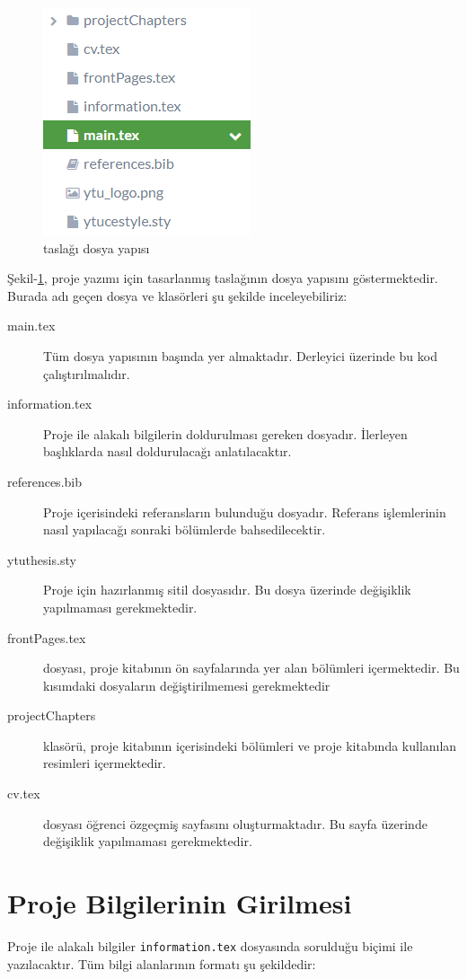 \begin{figure}[!ht]
  \centering
  \includegraphics{zkilavuz/dosyayapisi}
  \caption{\latex taslağı dosya yapısı}
  \label{fig:dosyayapisi}
\end{figure}

Şekil-\ref{fig:dosyayapisi}, proje yazımı için tasarlanmış \latex taslağının dosya yapısını göstermektedir. Burada adı geçen dosya ve klasörleri şu şekilde inceleyebiliriz:

\begin{description}
    \item[main.tex] Tüm dosya yapısının başında yer almaktadır. Derleyici üzerinde bu kod çalıştırılmalıdır.
    \item[information.tex] Proje ile alakalı bilgilerin doldurulması gereken dosyadır. İlerleyen başlıklarda nasıl doldurulacağı anlatılacaktır.
    \item[references.bib] Proje içerisindeki referansların bulunduğu dosyadır. Referans işlemlerinin nasıl yapılacağı sonraki bölümlerde bahsedilecektir.
    \item[ytuthesis.sty] Proje için hazırlanmış sitil dosyasıdır. Bu dosya üzerinde değişiklik yapılmaması gerekmektedir.
    \item[frontPages.tex] dosyası, proje kitabının ön sayfalarında yer alan bölümleri içermektedir. Bu kısımdaki dosyaların değiştirilmemesi gerekmektedir \item[projectChapters] klasörü, proje kitabının içerisindeki bölümleri ve proje kitabında kullanılan resimleri içermektedir.
    \item[cv.tex] dosyası öğrenci özgeçmiş sayfasını oluşturmaktadır. Bu sayfa üzerinde değişiklik yapılmaması gerekmektedir.
\end{description}

\section{Proje Bilgilerinin Girilmesi}
Proje ile alakalı bilgiler \texttt{information.tex} dosyasında sorulduğu biçimi ile yazılacaktır. Tüm bilgi alanlarının formatı şu şekildedir:

